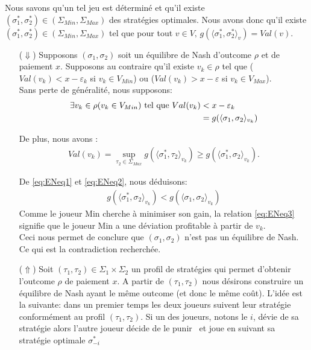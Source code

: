 \begin{demonstration}
	
	Nous savons qu'un tel jeu est déterminé et qu'il existe $(\sigma_{1}^* , \sigma_{2}^*) \in (\Sigma_{Min},\Sigma_{Max})$ des stratégies optimales. Nous avons donc qu'il existe $(\sigma_{1}^* , \sigma_{2}^*) \in (\Sigma_{Min},\Sigma_{Max})$ tel que pour tout $v \in V,\, g(\langle \sigma_1^*,\sigma_2^* \rangle_v) = Val(v)$. \\
	
	\begin{itemize}
		\item[($\Downarrow$)] Supposons $(\sigma_1, \sigma_2)$ soit un équilibre de Nash d'outcome $\rho$ et de paiement $x$. Supposons au contraire qu'il existe $v_k \in \rho$ tel que ($Val(v_k) < x - \varepsilon_k$ si $v_k \in V_{Min}$) ou ($Val(v_k) > x - \varepsilon $ si $v_k \in V_{Max}$).\\
		Sans perte de généralité, nous supposons:  
		\begin{align}
			\exists v_k \in \rho (v_k \in V_{Min}) \text{ tel que } Val(v_k) &< x - \varepsilon_k \notag \\
																			&= g(\langle \sigma_1, \sigma_2 \rangle_{v_k}) \label{eq:ENeq1}
		\end{align}
		
		De plus, nous avons :
		\begin{align} Val(v_k) = \sup_{\tau_2 \in \Sigma_{Max}} g(\langle \sigma_1^*, \tau_2 \rangle_{v_k}) \geq g(\langle \sigma_1^*,\sigma_2 \rangle_{v_k}). \label{eq:ENeq2}\end{align}
			
		De \eqref{eq:ENeq1} et \eqref{eq:ENeq2}, nous déduisons:
		\begin{align}
			g(\langle \sigma_1^*, \sigma_2 \rangle _{v_k}) < g (\langle \sigma_1, \sigma_2 \rangle_{v_k}) \label{eq:ENeq3}
		\end{align}
		Comme le joueur Min cherche à minimiser son gain, la relation \eqref{eq:ENeq3} signifie que le joueur Min a une déviation profitable  à partir de $v_k$.\\
		Ceci nous permet de conclure que $(\sigma_1,\sigma_2)$ n'est pas un équilibre de Nash. Ce qui est la contradiction recherchée. \\
		
		\item[($\Uparrow$)]
		Soit $(\tau_1, \tau_2) \in \Sigma_1 \times \Sigma_2$ un profil de stratégies qui permet d'obtenir l'outcome $\rho$ de paiement $x$.
		A partir de $(\tau_1, \tau_2)$ nous désirons construire un équilibre de Nash ayant le même outcome (et donc le même coût).
		L'idée est la suivante: dans un premier temps les deux joueurs suivent leur stratégie conformément au profil $(\tau_1,\tau_2)$. Si un des joueurs, notons le $i$,  dévie de sa stratégie alors l'autre joueur décide de le \og punir \fg~et joue en suivant sa stratégie optimale $\sigma_{-i}^*$\\ 
		

\end{itemize}
\end{demonstration}
